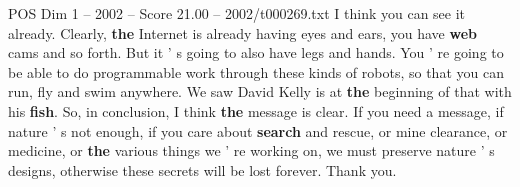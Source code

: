 \begin{textsample}{POS Dim 1 – 2002 – Score 21.00 – 2002/t000269.txt}
I think you can see it already.
Clearly, \textbf{the} Internet is already having eyes and ears, you have \textbf{web} cams and so forth.
But it ' s going to also have legs and hands.
You ' re going to be able to do programmable work through these kinds of robots, so that you can run, fly and swim anywhere.
We saw David Kelly is at \textbf{the} beginning of that with his \textbf{fish}.
So, in conclusion, I think \textbf{the} message is clear.
If you need a message, if nature ' s not enough, if you care about \textbf{search} and rescue, or mine clearance, or medicine, or \textbf{the} various things we ' re working on, we must preserve nature ' s designs, otherwise these secrets will be lost forever.
Thank you.

\end{textsample}
